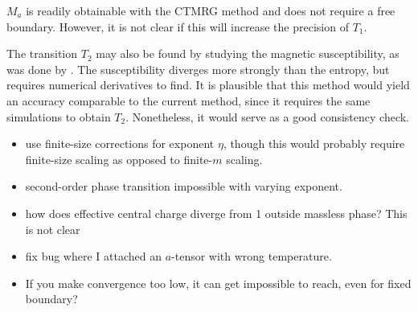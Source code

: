 $M_a$ is readily obtainable with the CTMRG method and does not require a free boundary.
However, it is not clear if this will increase the precision of $T_1$.

The transition $T_2$ may also be found by studying the magnetic susceptibility,
as was done by \cite{borisenko2011numerical}.
The susceptibility diverges more strongly than the entropy, but requires numerical derivatives to find.
It is plausible that this method would yield an accuracy comparable to the current method,
since it requires the same simulations to obtain $T_2$. Nonetheless, it would serve as a good consistency check.


\begin{itemize}
  \item use finite-size corrections for exponent $\eta$, though this would probably require finite-size scaling
  as opposed to finite-$m$ scaling.
  \item second-order phase transition impossible with varying exponent.
  \item how does effective central charge diverge from 1 outside massless phase? This is not clear
\end{itemize}


\begin{itemize}
  \item fix bug where I attached an $a$-tensor with wrong temperature.
  \item If you make convergence too low, it can get impossible to reach, even for fixed boundary?
\end{itemize}
